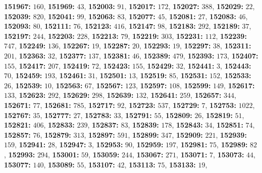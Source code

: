 \textsf{\bfseries 151967:} $160$, \textsf{\bfseries 151969:} $43$, \textsf{\bfseries 152003:} $91$, \textsf{\bfseries 152017:} $172$, \textsf{\bfseries 152027:} $388$, \textsf{\bfseries 152029:} $22$, \textsf{\bfseries 152039:} $820$, \textsf{\bfseries 152041:} $99$, \textsf{\bfseries 152063:} $83$, \textsf{\bfseries 152077:} $45$, \textsf{\bfseries 152081:} $27$, \textsf{\bfseries 152083:} $46$, \textsf{\bfseries 152093:} $80$, \textsf{\bfseries 152111:} $76$, \textsf{\bfseries 152123:} $416$, \textsf{\bfseries 152147:} $98$, \textsf{\bfseries 152183:} $292$, \textsf{\bfseries 152189:} $37$, \textsf{\bfseries 152197:} $244$, \textsf{\bfseries 152203:} $228$, \textsf{\bfseries 152213:} $79$, \textsf{\bfseries 152219:} $303$, \textsf{\bfseries 152231:} $112$, \textsf{\bfseries 152239:} $747$, \textsf{\bfseries 152249:} $136$, \textsf{\bfseries 152267:} $19$, \textsf{\bfseries 152287:} $20$, \textsf{\bfseries 152293:} $19$, \textsf{\bfseries 152297:} $38$, \textsf{\bfseries 152311:} $201$, \textsf{\bfseries 152363:} $32$, \textsf{\bfseries 152377:} $137$, \textsf{\bfseries 152381:} $46$, \textsf{\bfseries 152389:} $479$, \textsf{\bfseries 152393:} $173$, \textsf{\bfseries 152407:} $155$, \textsf{\bfseries 152417:} $207$, \textsf{\bfseries 152419:} $72$, \textsf{\bfseries 152423:} $155$, \textsf{\bfseries 152429:} $32$, \textsf{\bfseries 152441:} $3$, \textsf{\bfseries 152443:} $70$, \textsf{\bfseries 152459:} $193$, \textsf{\bfseries 152461:} $31$, \textsf{\bfseries 152501:} $13$, \textsf{\bfseries 152519:} $85$, \textsf{\bfseries 152531:} $152$, \textsf{\bfseries 152533:} $26$, \textsf{\bfseries 152539:} $10$, \textsf{\bfseries 152563:} $67$, \textsf{\bfseries 152567:} $123$, \textsf{\bfseries 152597:} $108$, \textsf{\bfseries 152599:} $149$, \textsf{\bfseries 152617:} $133$, \textsf{\bfseries 152623:} $292$, \textsf{\bfseries 152629:} $298$, \textsf{\bfseries 152639:} $132$, \textsf{\bfseries 152641:} $259$, \textsf{\bfseries 152657:} $344$, \textsf{\bfseries 152671:} $77$, \textsf{\bfseries 152681:} $785$, \textsf{\bfseries 152717:} $92$, \textsf{\bfseries 152723:} $537$, \textsf{\bfseries 152729:} $7$, \textsf{\bfseries 152753:} $1022$, \textsf{\bfseries 152767:} $35$, \textsf{\bfseries 152777:} $27$, \textsf{\bfseries 152783:} $33$, \textsf{\bfseries 152791:} $55$, \textsf{\bfseries 152809:} $26$, \textsf{\bfseries 152819:} $51$, \textsf{\bfseries 152821:} $406$, \textsf{\bfseries 152833:} $239$, \textsf{\bfseries 152837:} $83$, \textsf{\bfseries 152839:} $178$, \textsf{\bfseries 152843:} $34$, \textsf{\bfseries 152851:} $74$, \textsf{\bfseries 152857:} $76$, \textsf{\bfseries 152879:} $313$, \textsf{\bfseries 152897:} $591$, \textsf{\bfseries 152899:} $347$, \textsf{\bfseries 152909:} $221$, \textsf{\bfseries 152939:} $159$, \textsf{\bfseries 152941:} $28$, \textsf{\bfseries 152947:} $3$, \textsf{\bfseries 152953:} $90$, \textsf{\bfseries 152959:} $197$, \textsf{\bfseries 152981:} $75$, \textsf{\bfseries 152989:} $82$, \textsf{\bfseries 152993:} $294$, \textsf{\bfseries 153001:} $59$, \textsf{\bfseries 153059:} $244$, \textsf{\bfseries 153067:} $271$, \textsf{\bfseries 153071:} $7$, \textsf{\bfseries 153073:} $44$, \textsf{\bfseries 153077:} $140$, \textsf{\bfseries 153089:} $55$, \textsf{\bfseries 153107:} $42$, \textsf{\bfseries 153113:} $75$, \textsf{\bfseries 153133:} $19$, 
